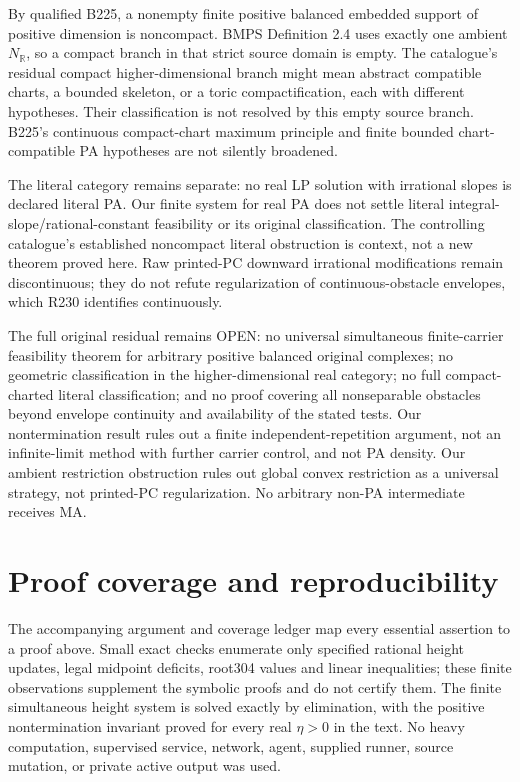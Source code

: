\documentclass[11pt]{article}
\newcommand{\R}{\mathbb R}
\begin{document}
By qualified B225, a nonempty finite positive balanced embedded support of positive dimension is noncompact. BMPS Definition 2.4 uses exactly one ambient $N_\R$, so a compact branch in that strict source domain is empty. The catalogue's residual compact higher-dimensional branch might mean abstract compatible charts, a bounded skeleton, or a toric compactification, each with different hypotheses. Their classification is not resolved by this empty source branch. B225's continuous compact-chart maximum principle and finite bounded chart-compatible PA hypotheses are not silently broadened.

The literal category remains separate: no real LP solution with irrational slopes is declared literal PA. Our finite system for real PA does not settle literal integral-slope/rational-constant feasibility or its original classification. The controlling catalogue's established noncompact literal obstruction is context, not a new theorem proved here. Raw printed-PC downward irrational modifications remain discontinuous; they do not refute regularization of continuous-obstacle envelopes, which R230 identifies continuously.

The full original residual remains OPEN: no universal simultaneous finite-carrier feasibility theorem for arbitrary positive balanced original complexes; no geometric classification in the higher-dimensional real category; no full compact-charted literal classification; and no proof covering all nonseparable obstacles beyond envelope continuity and availability of the stated tests. Our nontermination result rules out a finite independent-repetition argument, not an infinite-limit method with further carrier control, and not PA density. Our ambient restriction obstruction rules out global convex restriction as a universal strategy, not printed-PC regularization. No arbitrary non-PA intermediate receives MA.

\section{Proof coverage and reproducibility}
The accompanying argument and coverage ledger map every essential assertion to a proof above. Small exact checks enumerate only specified rational height updates, legal midpoint deficits, root304 values and linear inequalities; these finite observations supplement the symbolic proofs and do not certify them. The finite simultaneous height system is solved exactly by elimination, with the positive nontermination invariant proved for every real $\eta>0$ in the text. No heavy computation, supervised service, network, agent, supplied runner, source mutation, or private active output was used.
\end{document}
